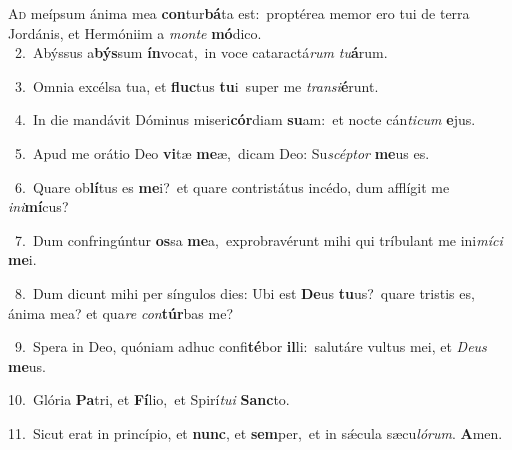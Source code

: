 \lettrine{\initial\textcolor{\initialcolor}{A}}{d} meípsum ánima mea \textbf{con}\-tur\-\textbf{bá}\-ta est:~\star proptérea memor ero tui de terra Jordánis, et Hermóniim a \textit{mon}\-\textit{te} \textbf{mó}\-dico.\\
{\numbfont\textcolor{\numbcolor}{~2.}}~Abýssus a\-\textbf{býs}\-sum \textbf{ín}\-vocat,~\star in voce cataractá\textit{rum} \textit{tu}\-\textbf{á}rum.\par
{\numbfont\textcolor{\numbcolor}{~3.}}~Omnia excélsa tua, et \textbf{fluc}\-tus \textbf{tu}\-i~\star super me \textit{trans}\-\textit{i}\textbf{é}runt.\par
{\numbfont\textcolor{\numbcolor}{~4.}}~In die mandávit Dóminus miseri\-\textbf{cór}\-diam \textbf{su}\-am:~\star et nocte cán\-\textit{ti}\-\textit{cum} \textbf{e}\-jus.\par
{\numbfont\textcolor{\numbcolor}{~5.}}~Apud me orátio Deo \textbf{vi}\-tæ \textbf{me}\-æ,~\star dicam Deo: Su\-\textit{scép}\-\textit{tor} \textbf{me}\-us es.\par
{\numbfont\textcolor{\numbcolor}{~6.}}~Quare ob\-\textbf{lí}\-tus es \textbf{me}\-i?~\star et quare contristátus incédo, dum afflígit me \textit{in}\-\textit{i}\textbf{mí}cus?\par
{\numbfont\textcolor{\numbcolor}{~7.}}~Dum confringúntur \textbf{os}\-sa \textbf{me}\-a,~\star exprobravérunt mihi qui tríbulant me ini\-\textit{mí}\-\textit{ci} \textbf{me}\-i.\par
{\numbfont\textcolor{\numbcolor}{~8.}}~Dum dicunt mihi per síngulos dies: Ubi est \textbf{De}\-us \textbf{tu}\-us?~\star quare tristis es, ánima mea? et qua\textit{re} \textit{con}\-\textbf{túr}bas me?\par
{\numbfont\textcolor{\numbcolor}{~9.}}~Spera in Deo, quóniam adhuc confi\-\textbf{té}\-bor \textbf{il}\-li:~\star salutáre vultus mei, et \textit{De}\-\textit{us} \textbf{me}\-us.\par
{\numbfont\textcolor{\numbcolor}{10.}}~Glória \textbf{Pa}\-tri, et \textbf{Fí}\-lio,~\star et Spirí\-\textit{tu}\-\textit{i} \textbf{Sanc}\-to.\par
{\numbfont\textcolor{\numbcolor}{11.}}~Sicut erat in princípio, et \textbf{nunc}\-, et \textbf{sem}\-per,~\star et in sǽcula sæcu\-\textit{ló}\-\textit{rum}. \textbf{A}\-men.\par
